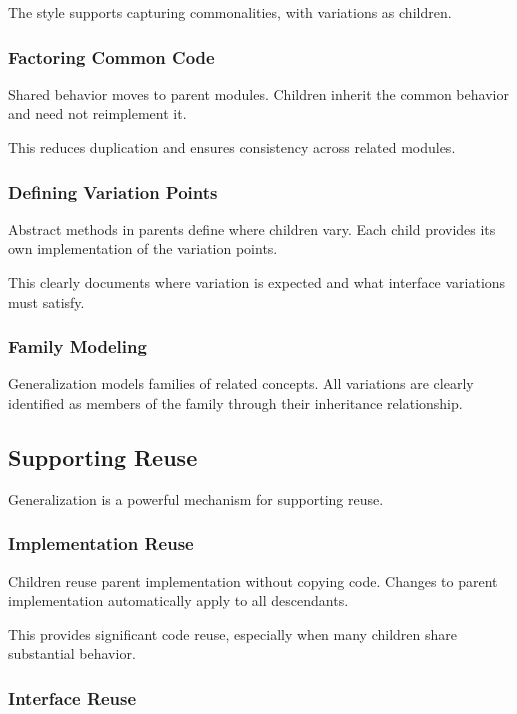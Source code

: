 \documentclass[11pt]{article}
\begin{document}
The style supports capturing commonalities, with variations as children.

\subsubsection{Factoring Common Code}

Shared behavior moves to parent modules. Children inherit the common behavior and need not reimplement it.

This reduces duplication and ensures consistency across related modules.

\subsubsection{Defining Variation Points}

Abstract methods in parents define where children vary. Each child provides its own implementation of the variation points.

This clearly documents where variation is expected and what interface variations must satisfy.

\subsubsection{Family Modeling}

Generalization models families of related concepts. All variations are clearly identified as members of the family through their inheritance relationship.

\subsection{Supporting Reuse}

Generalization is a powerful mechanism for supporting reuse.

\subsubsection{Implementation Reuse}

Children reuse parent implementation without copying code. Changes to parent implementation automatically apply to all descendants.

This provides significant code reuse, especially when many children share substantial behavior.

\subsubsection{Interface Reuse}
\end{document}
